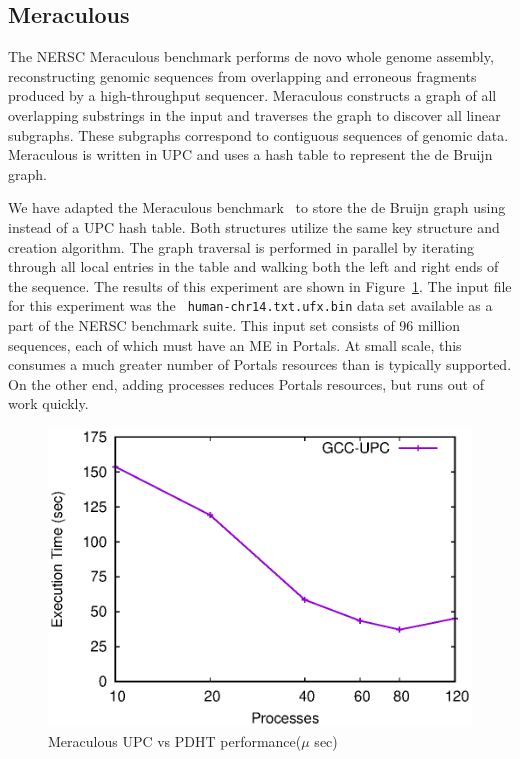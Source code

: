 \subsection{Meraculous}

The NERSC Meraculous benchmark performs de novo whole genome assembly,
reconstructing genomic sequences from overlapping and erroneous fragments
produced by a high-throughput sequencer. Meraculous constructs a graph of all
overlapping substrings in the input and traverses the graph to discover all
linear subgraphs. These subgraphs correspond to contiguous sequences of
genomic data. Meraculous is written in UPC and uses a hash table
to represent the de Bruijn graph. 

We have adapted the Meraculous benchmark~\cite{georganas:14} to store the de Bruijn
graph using \pdht instead of a UPC hash table. Both structures utilize the same key
structure and creation algorithm. The graph traversal is performed in parallel
by iterating through all local entries in the table and walking both the left
and right ends of the sequence. The results of this experiment are shown in
Figure~\ref{fig:meraculous}. The input file for this experiment was the {\tt
  human-chr14.txt.ufx.bin} data set available as a part of the NERSC benchmark
suite. This input set consists of 96 million sequences, each of which must have
an ME in Portals. At small scale, this consumes a much greater number of
Portals resources than is typically supported. On the other end, adding 
processes reduces Portals resources, but runs out of work quickly.

\begin{figure}
  \centering
  \includegraphics[width=.9\linewidth]{plots/meraculous}
  \caption{Meraculous UPC vs PDHT performance($\mu$ sec)}
  \label{fig:meraculous}
\end{figure}



